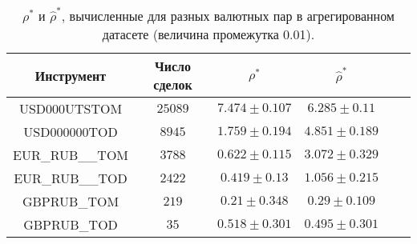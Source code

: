 \begin{table}[h!]
    \begin{center}
        \begin{tabular}{|c|c|c|c|c|c|}
            \hline
            Инструмент      & Число сделок & $\rho^*$ & $\hat \rho^*$            \\ \hline
            USD000UTSTOM    & $25089$      & $7.474 \pm 0.107$ & $6.285 \pm 0.11$  \\ \hline
            USD000000TOD    & $8945$       & $1.759 \pm 0.194$ & $4.851 \pm 0.189$ \\ \hline
            EUR\_RUB\_\_TOM & $3788$       & $0.622 \pm 0.115$ & $3.072 \pm 0.329$ \\ \hline
            EUR\_RUB\_\_TOD & $2422$       & $0.419 \pm 0.13$  & $1.056 \pm 0.215$ \\ \hline
            GBPRUB\_TOM     & $219$        & $0.21 \pm 0.348$  & $0.29 \pm 0.109$  \\ \hline
            GBPRUB\_TOD     & $35$         & $0.518 \pm 0.301$ & $0.495 \pm 0.301$ \\ \hline

        \end{tabular}
    \end{center}
    \caption{$\rho^*$ и $\hat \rho^*$, вычисленные для разных валютных пар в агрегированном датасете (величина промежутка 0.01).}
    \label{Aggreg1CU}
\end{table}

